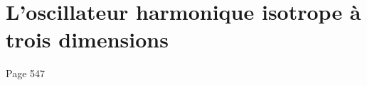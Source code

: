 \chapter{L'oscillateur harmonique isotrope à trois dimensions}
\label{chapter:oscillateur_harmonique_isotrope_trois_dim}
Page 547
